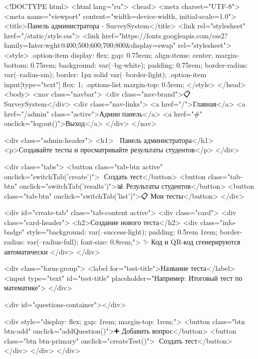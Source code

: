 <!DOCTYPE html>
<html lang="ru">
<head>
    <meta charset="UTF-8">
    <meta name="viewport" content="width=device-width, initial-scale=1.0">
    <title>Панель администратора - SurveySystem</title>
    <link rel="stylesheet" href="/static/style.css">
    <link href="https://fonts.googleapis.com/css2?family=Inter:wght@400;500;600;700;800&display=swap" rel="stylesheet">
    <style>
        .option-item {
            display: flex;
            gap: 0.75rem;
            align-items: center;
            margin-bottom: 0.75rem;
            background: var(--bg-white);
            padding: 0.75rem;
            border-radius: var(--radius-sm);
            border: 1px solid var(--border-light);
        }
        .option-item input[type="text"] {
            flex: 1;
        }
        .options-list {
            margin-top: 0.5rem;
        }
    </style>
</head>
<body>
    <nav class="navbar">
        <div class="nav-brand">📋 SurveySystem</div>
        <div class="nav-links">
            <a href="/">Главная</a>
            <a href="/admin" class="active">Админ панель</a>
            <a href="#" onclick="logout()">Выход</a>
        </div>
    </nav>

    <div class="admin-header">
        <h1>👨‍💼 Панель администратора</h1>
        <p>Создавайте тесты и просматривайте результаты студентов</p>
    </div>

    <div class="tabs">
        <button class="tab-btn active" onclick="switchTab('create')">📝 Создать тест</button>
        <button class="tab-btn" onclick="switchTab('results')">📊 Результаты студентов</button>
        <button class="tab-btn" onclick="switchTab('list')">📋 Мои тесты</button>
    </div>

    <div id="create-tab" class="tab-content active">
        <div class="card">
            <div class="card-header">
                <h2>Создание нового теста</h2>
                <div class="info-badge" style="background: var(--success-light); padding: 0.5rem 1rem; border-radius: var(--radius-full); font-size: 0.8rem;">
                    ✨ Код и QR-код сгенерируются автоматически
                </div>
            </div>
            
            <div class="form-group">
                <label for="test-title">Название теста</label>
                <input type="text" id="test-title" placeholder="Например: Итоговый тест по математике">
            </div>
            
            <div id="questions-container"></div>
            
            <div style="display: flex; gap: 1rem; margin-top: 1rem;">
                <button class="btn btn-add" onclick="addQuestion()">➕ Добавить вопрос</button>
                <button class="btn btn-primary" onclick="createTest()">🚀 Создать тест</button>
            </div>
        </div>
    </div>

